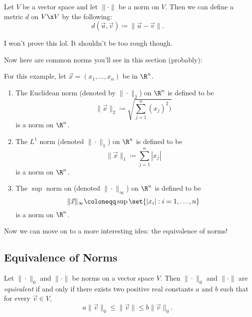 \documentclass[class=article, crop=false]{standalone}
\begin{document}
\begin{fact}
    Let $V$ be a vector space and let $\| \cdot \|$ be a norm on $V$. Then we can define a metric $d$ on $V \x V$ by the following:
        \[
            d(\vec u, \vec v) \coloneqq \|\vec u - \vec v \|.
        \]
\end{fact}
I won't prove this lol. It shouldn't be too rough though.

Now here are common norms you'll see in this section (probably):
\begin{ex}
    For this example, let $\vec x = (x_1, \ldots, x_n)$ be in $\R^n$.
    \begin{enumerate}[$\bullet$]
        \item The Euclidean norm (denoted by $\|\cdot\|_2$) on $\R^n$ is defined to be
            \[
                \| \vec x \|_2 \coloneqq \sqrt{\sum_{j=1}^{n} (x_j)^2)}
            \]
        is a norm on $\R^n$.

        \item The $L^1$ norm (denoted $\|\cdot\|_1$) on $\R^n$ is defined to be
            \[
                \| \vec x \|_1 \coloneqq \sum_{j=1}^{n} |x_j|
            \]
        is a norm on $\R^n$.

        \item The $\sup$ norm on (denoted $\|\cdot\|_\infty$) on $\R^n$ is defined to be
            \[
                \| \vec x\|_\infty \coloneqq \sup \set{|x_i| : i=1,\ldots,n}
            \]
        is a norm on $\R^n$.
    \end{enumerate}
\end{ex}

Now we can move on to a more interesting idea: the equivalence of norms!











\subsection{Equivalence of Norms}

\begin{defn}
    Let $\| \cdot \|_0$ and $\| \cdot \|$ be norms on a vector space $V$. Then $\| \cdot \|_0$ and $\| \cdot \|$ are \textit{equivalent} if and only if there exists two positive real constants $a$ and $b$ such that for every $\vec v \in V$,
        \[
            a \| \vec v \|_0 \leq \| \vec v \| \leq b\| \vec v \|_0.
        \]
\end{defn}
\end{document}
